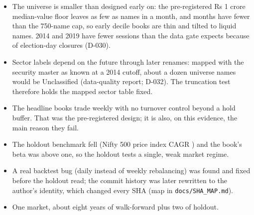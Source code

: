 \begin{itemize}
\item The universe is smaller than designed early on: the pre-registered Rs 1 crore median-value floor leaves as few as  names in a month, and  months have fewer than the 750-name cap, so early decile books are thin and tilted to liquid names. 2014 and 2019 have fewer sessions than the data gate expects because of election-day closures (D-030).
\item Sector labels depend on the future through later renames: mapped with the security master as known at a 2014 cutoff, about a dozen universe names would be Unclassified (data-quality report; D-032). The truncation test therefore holds the mapped sector table fixed.
\item The headline books trade weekly with no turnover control beyond a hold buffer. That was the pre-registered design; it is also, on this evidence, the main reason they fail.
\item The holdout benchmark fell (Nifty 500 price index CAGR ) and the book's beta was above one, so the holdout tests a single, weak market regime.
\item A real backtest bug (daily instead of weekly rebalancing) was found and fixed before the holdout read; the commit history was later rewritten to the author's identity, which changed every SHA (map in \texttt{docs/SHA\_MAP.md}).
\item One market, about eight years of walk-forward plus two of holdout.
\end{itemize}
